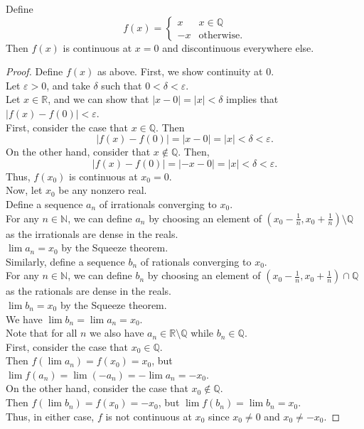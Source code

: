 \documentclass{article}
\newenvironment{theorem}[1]{\renewcommand\theinnercustomthm{#1}\innercustomthm}
  {\endinnercustomthm}
\begin{document}
\newpage{}
\begin{theorem}{6}
    Define
    \[f(x) = \begin{cases}x & x \in \mathbb Q \\ -x & \text{otherwise}.\end{cases}\]
    Then $f(x)$ is continuous at $x =0$ and discontinuous everywhere else.
\end{theorem}
\begin{proof}
    Define $f(x)$ as above. First, we show continuity at $0$. \\
    Let $\varepsilon > 0$, and take $\delta$ such that $0 < \delta < \varepsilon$. \\
    Let $x \in \mathbb R$, and we can show that $|x-0| = |x|< \delta$ implies that $|f(x)-f(0)| < \varepsilon$. \\
    First, consider the case that $x \in \mathbb Q$. Then \\
    \[|f(x)-f(0)|=|x-0|=|x|<\delta < \varepsilon.\]
    On the other hand, consider that $x \not \in \mathbb Q$. Then,
    \[|f(x)-f(0)| = |-x-0|=|x|<\delta < \varepsilon.\]
    Thus, $f(x_0)$ is continuous at $x_0=0$. \\

    Now, let $x_0$ be any nonzero real. \\
    Define a sequence $a_n$ of irrationals converging to $x_0$. \\
    For any $n \in \mathbb N$, we can define $a_n$ by choosing an element of $(x_0-\frac{1}{n},x_0+\frac{1}{n})\setminus \mathbb Q$ as the irrationals are dense in the reals. \\
    $\lim a_n =x_0$ by the Squeeze theorem. \\
    Similarly, define a sequence $b_n$ of rationals converging to $x_0$. \\
    For any $n \in \mathbb N$, we can define $b_n$ by choosing an element of $(x_0 - \frac{1}{n},x_0+\frac{1}{n})\cap \mathbb Q$ as the rationals are dense in the reals. \\
    $\lim b_n =x_0$ by the Squeeze theorem. \\
    We have $\lim b_n=\lim a_n = x_0$. \\
    Note that for all $n$ we also have $a_n \in \mathbb R \setminus \mathbb Q$ while $b_n \in \mathbb Q$. \\
    First, consider the case that $x_0 \in \mathbb Q$. \\ Then $f(\lim a_n) = f(x_0)=x_0$, but $\lim f(a_n) = \lim (-a_n) =-\lim a_n = -x_0$. \\
    On the other hand, consider the case that $x_0 \not\in \mathbb Q$. \\
    Then $f(\lim b_n) = f(x_0) = -x_0$, but $\lim f(b_n) = \lim b_n = x_0$. \\
    Thus, in either case, $f$ is not continuous at $x_0$ since $x_0\neq 0$ and $x_0 \neq -x_0$.
\end{proof}
\end{document}
